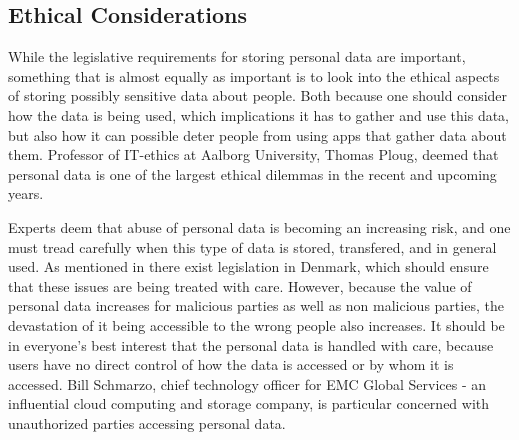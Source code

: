 
\subsection{Ethical Considerations}
\label{sub:ethical_considerations}

While the legislative requirements for storing personal data are important, something that is almost equally as important is to look into the ethical aspects of storing possibly sensitive data about people. Both because one should consider how the data is being used, which implications it has to gather and use this data, but also how it can possible deter people from using apps that gather data about them. Professor of IT-ethics at Aalborg University, Thomas Ploug, deemed that personal data is one of the largest ethical dilemmas in the recent and upcoming years.


Experts deem that abuse of personal data is becoming an increasing risk, and one must tread carefully when this type of data is stored, transfered, and in general used. As mentioned in  there exist legislation in Denmark, which should ensure that these issues are being treated with care. However, because the value of personal data increases for malicious parties as well as non malicious parties, the devastation of it being accessible to the wrong people also increases. It should be in everyone's best interest that the personal data is handled with care, because users have no direct control of how the data is accessed or by whom it is accessed. Bill Schmarzo, chief technology officer for EMC Global Services - an influential cloud computing and storage company, is particular concerned with unauthorized parties accessing personal data.


